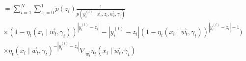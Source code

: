 \begin{align*}
\begin{split}
                    \end{split}\\
                    \begin{split}&= \sum_{i = 1}^N \sum_{z_i = 0}^1 \tilde p(z_i) \frac{1}{p(y_i^{(t)}\mid \vec x_i, z_i, \vec w_t, \gamma_t)}\\
                        &\times (1 - {\eta_t(x_i \mid \vec w_t, \gamma_t)})^{|y_i^{(t)} - z_i|} - {|y_i^{(t)} - z_i|}(1 - {\eta_t(x_i \mid \vec w_t, \gamma_t)})^{{|y_i^{(t)} - z_i|} - 1})\\
                        &\times {\eta_t(x_i \mid \vec w_t, \gamma_t)}^{-{|y_i^{(t)} - z_i|}}\nabla_{\vec w_t} \eta_t(x_i \mid \vec w_t, \gamma_t)\\
                    \end{split}\\
            \end{align*}
